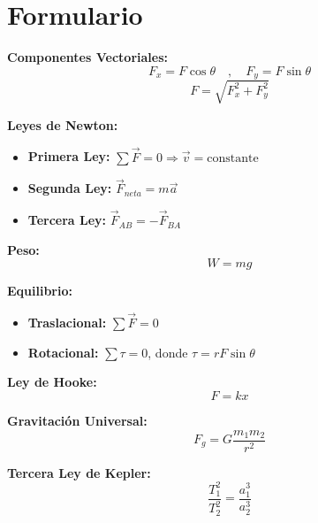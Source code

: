 \newpage
\section{Formulario}

\begin{nota}
\textbf{Componentes Vectoriales:}
$$F_x = F\cos\theta \quad , \quad F_y = F\sin\theta$$
$$F = \sqrt{F_x^2 + F_y^2}$$

\vspace{0.3cm}

\textbf{Leyes de Newton:}
\begin{itemize}
    \item \textbf{Primera Ley:} $\sum \vec{F} = 0 \Rightarrow \vec{v} = \text{constante}$
    \item \textbf{Segunda Ley:} $\vec{F}_{neta} = m\vec{a}$
    \item \textbf{Tercera Ley:} $\vec{F}_{AB} = -\vec{F}_{BA}$
\end{itemize}

\vspace{0.3cm}

\textbf{Peso:}
$$W = mg$$

\vspace{0.3cm}

\textbf{Equilibrio:}
\begin{itemize}
    \item \textbf{Traslacional:} $\sum \vec{F} = 0$
    \item \textbf{Rotacional:} $\sum \tau = 0$, donde $\tau = rF\sin\theta$
\end{itemize}

\vspace{0.3cm}

\textbf{Ley de Hooke:}
$$F = kx$$

\vspace{0.3cm}

\textbf{Gravitación Universal:}
$$F_g = G\frac{m_1 m_2}{r^2}$$

\vspace{0.3cm}

\textbf{Tercera Ley de Kepler:}
$$\frac{T_1^2}{T_2^2} = \frac{a_1^3}{a_2^3}$$
\end{nota}

